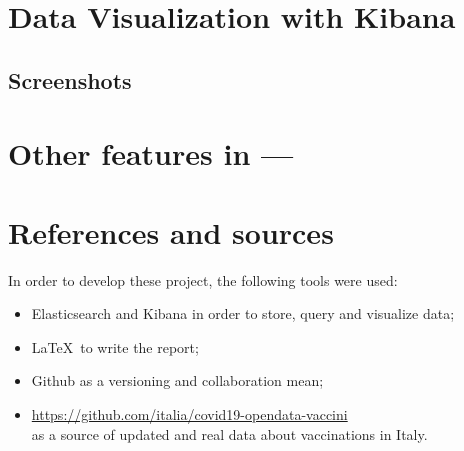 \documentclass[12pt, a4paper]{article}
\begin{document}
\noindent
\blindtext

\clearpage

\section{Data Visualization with Kibana}

\blindtext

\subsection{Screenshots}

\blindtext

\clearpage

\section{Other features in ---} 

\blindtext

\clearpage

\section{References and sources}

In order to develop these project, the following tools were used:

\begin{itemize}
    \item Elasticsearch and Kibana in order to store, query and visualize data;
    \item \LaTeX~to write the report;
    \item Github as a versioning and collaboration mean;
    \item \url{https://github.com/italia/covid19-opendata-vaccini} \\
        as a source of updated and real data about vaccinations in Italy.
\end{itemize}

\clearpage
\end{document}
